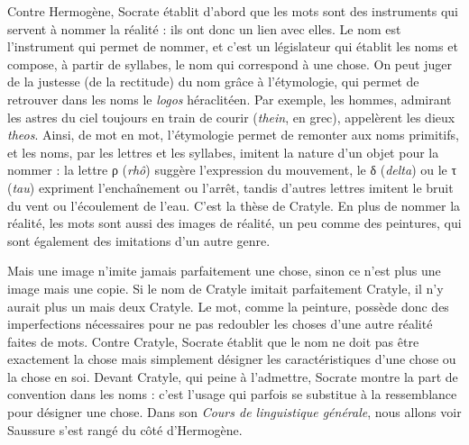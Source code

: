 Contre Hermogène, Socrate établit d’abord que les mots sont des instruments qui servent à nommer la réalité : ils ont donc un lien avec elles. Le nom est l’instrument qui permet de nommer, et c’est un législateur qui établit les noms et compose, à partir de syllabes, le nom qui correspond à une chose. On peut juger de la justesse (de la rectitude) du nom grâce à l’étymologie, qui permet de retrouver dans les noms le \textit{logos} héraclitéen. Par exemple, les hommes, admirant les astres du ciel toujours en train de courir (\textit{thein}, en grec), appelèrent les dieux \textit{theos}. Ainsi, de mot en mot, l’étymologie permet de remonter aux noms primitifs, et les noms, par les lettres et les syllabes, imitent la nature d’un objet pour la nommer : la lettre {\BBSixGreek ρ} (\textit{rhô}) suggère l’expression du mouvement, le {\BBSixGreek δ} (\textit{delta}) ou le {\BBSixGreek τ} (\textit{tau}) expriment l’enchaînement ou l’arrêt, tandis d’autres lettres imitent le bruit du vent ou l’écoulement de l’eau. C’est la thèse de Cratyle. En plus de nommer la réalité, les mots sont aussi des images de réalité, un peu comme des peintures, qui sont également des imitations d’un autre genre.

Mais une image n’imite jamais parfaitement une chose, sinon ce n’est plus une image mais une copie. Si le nom de Cratyle imitait parfaitement Cratyle, il n’y aurait plus un mais deux Cratyle. Le mot, comme la peinture, possède donc des imperfections nécessaires pour ne pas redoubler les choses d’une autre réalité faites de mots. Contre Cratyle, Socrate établit que le nom ne doit pas être exactement la chose mais simplement désigner les caractéristiques d’une chose ou la chose en soi. Devant Cratyle, qui peine à l’admettre, Socrate montre la part de convention dans les noms : c’est l’usage qui parfois se substitue à la ressemblance pour désigner une chose. Dans son \textit{Cours de linguistique générale}, nous allons voir Saussure s’est rangé du côté d’Hermogène.


